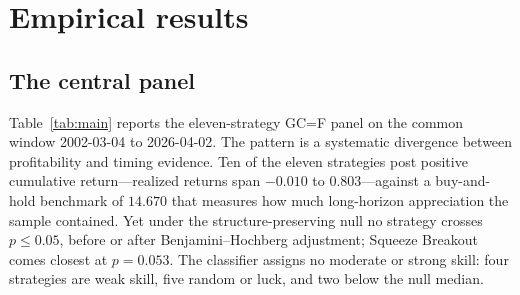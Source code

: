 \section{Empirical results}

\subsection{The central panel}

Table~\ref{tab:main} reports the eleven-strategy GC=F panel on the common window 2002-03-04 to 2026-04-02. The pattern is a systematic divergence between profitability and timing evidence. Ten of the eleven strategies post positive cumulative return---realized returns span $-0.010$ to $0.803$---against a buy-and-hold benchmark of $14.670$ that measures how much long-horizon appreciation the sample contained. Yet under the structure-preserving null no strategy crosses $p\le0.05$, before or after Benjamini--Hochberg adjustment; Squeeze Breakout comes closest at $p=0.053$. The classifier assigns no moderate or strong skill: four strategies are weak skill, five random or luck, and two below the null median.

